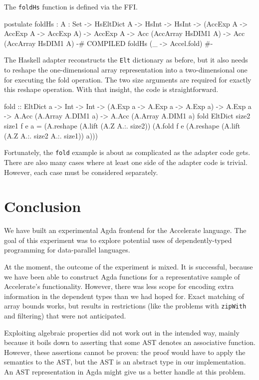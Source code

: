 \documentclass{llncs}
\begin{document}
The \texttt{foldHs} function is defined via the FFI.
\begin{code}
postulate
  foldHs : {A : Set}
          -> HsEltDict A
          -> HsInt
          -> HsInt
          -> (AccExp A -> AccExp A -> AccExp A)
          -> AccExp A
          -> Acc (AccArray HsDIM1 A)
          -> Acc (AccArray HsDIM1 A)
  {-# COMPILED foldHs      (\_ -> Accel.fold) #-}
\end{code}
The Haskell adapter reconstructs the \texttt{Elt} dictionary
as before, but it also needs to reshape the one-dimensional array
representation into a two-dimensional one for executing the fold
operation. The two size arguments are required for exactly this
reshape operation. With that insight, the code is straightforward.
\begin{hcode}
fold :: EltDict a
     -> Int -> Int
     -> (A.Exp a -> A.Exp a -> A.Exp a)
     -> A.Exp a
     -> A.Acc (A.Array A.DIM1 a)
     -> A.Acc (A.Array A.DIM1 a)
fold EltDict size2 size1 f e a =
     (A.reshape (A.lift (A.Z A.:. size2))
      (A.fold f e
       (A.reshape (A.lift (A.Z A.:. size2 A.:. size1)) a)))
\end{hcode}

Fortunately, the \texttt{fold} example is about as complicated as the
adapter code gets. There are also many cases where at least one side
of the adapter code is trivial. However, each case must be considered
separately. 

\section{Conclusion}
\label{sec:conclusion}

We have built an experimental Agda frontend for the Accelerate
language. The goal of this experiment was to explore potential uses of
dependently-typed programming for data-parallel languages. 

At the moment, the outcome of the experiment is mixed. It is
successful, because we have been able to construct Agda functions for
a representative sample of Accelerate's functionality.
However, there was less scope for encoding extra information in the
dependent types than we had hoped for. Exact matching of array bounds
works, but results in restrictions (like the problems with
\texttt{zipWith} and filtering) that were not anticipated.

Exploiting algebraic properties did not work out in the intended way, mainly
because it boils down to asserting that some AST denotes an
associative function. However, these assertions cannot be proven: the
proof would have to apply the semantics to the AST, but the AST is an
abstract type in our implementation. An AST representation in Agda
might give us a better handle at this problem. 
\end{document}
